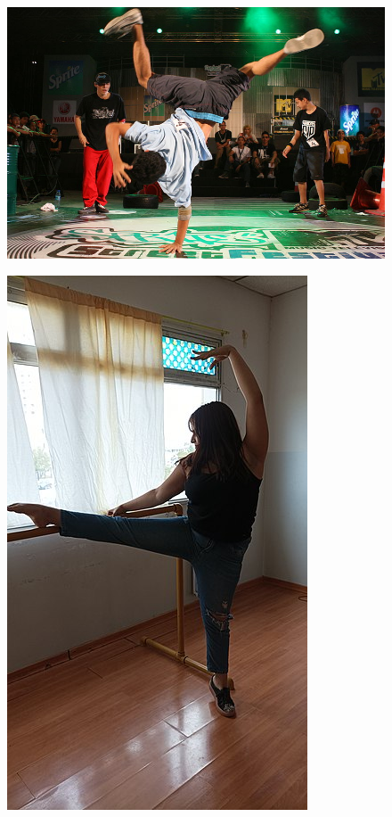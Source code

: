 \begin{figure}[htpb!]
\includegraphics[width=.5\textwidth]{./imgs/art35c.jpg}
\end{figure}
\begin{figure}[htpb!]
\includegraphics[width=.5\textwidth]{./imgs/art35d.jpg}
\end{figure}



%
%

